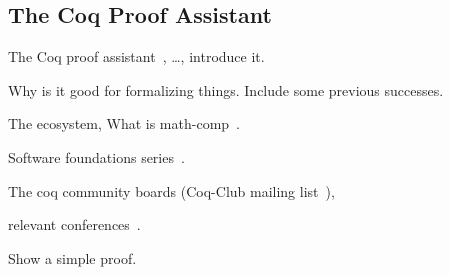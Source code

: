 \subsection{The Coq Proof Assistant}
\label{subsec:coq}

The Coq proof assistant~\cite{coq}, \dots, introduce it.

Why is it good for formalizing things.
Include some previous successes.

The ecosystem, What is math-comp~\cite{mahboubi2022}.

Software foundations series~\cite{softwarefoundation1, softwarefoundation2}.

The coq community boards (Coq-Club mailing list~\cite{coqclub}),

relevant conferences~\cite{itp, cpp}.

Show a simple proof.



